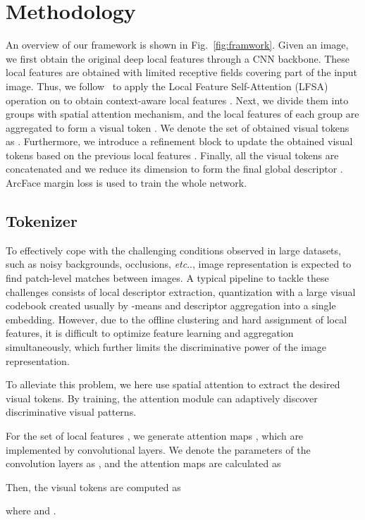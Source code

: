 \documentclass[letterpaper]{article} \usepackage{aaai22}  \usepackage{times}  \usepackage{helvet}  \usepackage{courier}  \usepackage[hyphens]{url}  \usepackage{graphicx} \urlstyle{rm} \def\UrlFont{\rm}  \usepackage{natbib}  \usepackage{caption} \DeclareCaptionStyle{ruled}{labelfont=normalfont,labelsep=colon,strut=off} \frenchspacing  \setlength{\pdfpagewidth}{8.5in}  \setlength{\pdfpageheight}{11in}  \usepackage{algorithm}
\makeatletter
\DeclareRobustCommand\onedot{\futurelet\@let@token\@onedot}
\def\@onedot{\ifx\@let@token.\else.\null\fi\xspace}
\def\etc{\emph{etc}\onedot} \def\vs{\emph{vs}\onedot}
\makeatother
\begin{document}
\section{Methodology} \label{sec:Methodology}
An overview of our framework is shown in Fig.~\ref{fig:framwork}. 
Given an image, we first obtain the original deep local features  through a CNN backbone. 
These local features are obtained with limited receptive fields covering part of the input image. 
Thus, we follow~\cite{ng2020solar} to apply the Local Feature Self-Attention (LFSA) operation on  to obtain context-aware local features . 
Next, we divide them into  groups with spatial attention mechanism, and the local features of each group are aggregated to form a visual token . 
We denote the set of obtained visual tokens as .
Furthermore, we introduce a refinement block to update the obtained visual tokens  based on the previous local features .
Finally, all the visual tokens are concatenated and we reduce its dimension to form the final global descriptor . ArcFace margin loss is used to train the whole network.
	
\subsection{Tokenizer}
To effectively cope with the challenging conditions observed in large datasets, such as noisy backgrounds, occlusions, \etc, image representation is expected to find patch-level matches between images.
A typical pipeline to tackle these challenges consists of local descriptor extraction, quantization with a large visual codebook created usually by -means and descriptor aggregation into a single embedding.
However, due to the offline clustering and hard assignment of local features, it is difficult to optimize feature learning and aggregation simultaneously, which further limits the discriminative power of the image representation.

To alleviate this problem, we here use spatial attention to extract the desired visual tokens.
By training, the attention module can adaptively discover discriminative visual patterns.

For the set of local features , we generate  attention maps , which are implemented by   convolutional layers. We denote the parameters of the convolution layers as , and the attention maps are calculated as

Then, the visual tokens  are computed as

where  and . 
 
\end{document}
